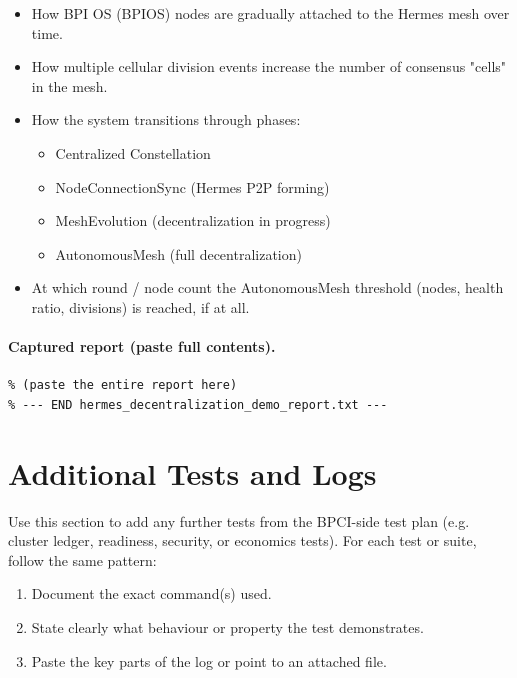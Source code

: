 \begin{itemize}
  \item How BPI OS (BPIOS) nodes are gradually attached to the Hermes mesh over time.
  \item How multiple cellular division events increase the number of consensus "cells" in the mesh.
  \item How the system transitions through phases:
    \begin{itemize}
      \item Centralized Constellation
      \item NodeConnectionSync (Hermes P2P forming)
      \item MeshEvolution (decentralization in progress)
      \item AutonomousMesh (full decentralization)
    \end{itemize}
  \item At which round / node count the AutonomousMesh threshold (nodes, health ratio, divisions) is reached, if at all.
\end{itemize}

\paragraph{Captured report (paste full contents).}

\begin{lstlisting}[language=text]
% --- BEGIN hermes_decentralization_demo_report.txt ---
% (paste the entire report here)
% --- END hermes_decentralization_demo_report.txt ---
\end{lstlisting}

\section{Additional Tests and Logs}

Use this section to add any further tests from the BPCI-side test plan (e.g. cluster ledger, readiness, security, or economics tests). For each test or suite, follow the same pattern:

\begin{enumerate}
  \item Document the exact command(s) used.
  \item State clearly what behaviour or property the test demonstrates.
  \item Paste the key parts of the log or point to an attached file.
\end{enumerate}

